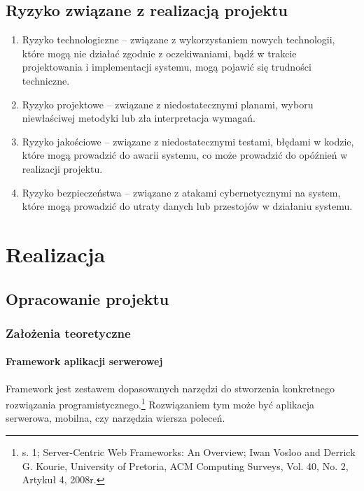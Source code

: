 \documentclass[12pt, a4paper, twoside, openany]{book}
\newcommand{\forceindent}{\leavevmode{\parindent=1.3em\indent}}
\begin{document}
\section{Ryzyko związane z realizacją projektu}

\begin{enumerate}[label=--]
    \item Ryzyko technologiczne -- związane z wykorzystaniem nowych technologii, które mogą nie działać zgodnie z oczekiwaniami, bądź w trakcie projektowania i implementacji systemu, mogą pojawić się trudności techniczne.
    \item Ryzyko projektowe -- związane z niedostatecznymi planami, wyboru niewłaściwej metodyki lub zła interpretacja wymagań.
    \item Ryzyko jakościowe -- związane z niedostatecznymi testami, błędami w kodzie, które mogą prowadzić do awarii systemu, co może prowadzić do opóźnień w realizacji projektu.
    \item Ryzyko bezpieczeństwa -- związane z atakami cybernetycznymi na system, które mogą prowadzić do utraty danych lub przestojów w działaniu systemu.
\end{enumerate}

\chapter{Realizacja}

\section{Opracowanie projektu}

\subsection{Założenia teoretyczne}

\subsubsection{Framework aplikacji serwerowej}

\forceindent Framework jest zestawem dopasowanych narzędzi do stworzenia konkretnego rozwiązania programistycznego.\footnote{s. 1; Server-Centric Web Frameworks: An Overview; Iwan Vosloo and Derrick G. Kourie, University of Pretoria, ACM Computing Surveys, Vol. 40, No. 2, Artykuł 4, 2008r.}
Rozwiązaniem tym może być aplikacja serwerowa, mobilna, czy narzędzia wiersza poleceń.
\end{document}
